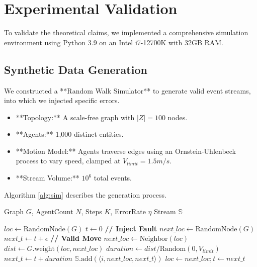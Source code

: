 \documentclass[conference]{IEEEtran}
\begin{document}
\section{Experimental Validation}

To validate the theoretical claims, we implemented a comprehensive simulation environment using Python 3.9 on an Intel i7-12700K with 32GB RAM.

\subsection{Synthetic Data Generation}
We constructed a **Random Walk Simulator** to generate valid event streams, into which we injected specific errors.

\begin{itemize}
    \item **Topology:** A scale-free graph with $|Z|=100$ nodes.
    \item **Agents:** 1,000 distinct entities.
    \item **Motion Model:** Agents traverse edges using an Ornstein-Uhlenbeck process to vary speed, clamped at $V_{limit} = 1.5m/s$.
    \item **Stream Volume:** $10^6$ total events.
\end{itemize}

Algorithm \ref{alg:sim} describes the generation process.

\begin{algorithm}[h]
\caption{Synthetic Stream Generator with Fault Injection}
\begin{algorithmic}[1]
\REQUIRE Graph $G$, AgentCount $N$, Steps $K$, ErrorRate $\eta$
\ENSURE Stream $\mathbb{S}$

    \STATE $loc \leftarrow \text{RandomNode}(G)$
    \STATE $t \leftarrow 0$
            \STATE \textbf{// Inject Fault}
            \STATE $next\_loc \leftarrow \text{RandomNode}(G)$ 
            \STATE $next\_t \leftarrow t + \epsilon$
        \ELSE
            \STATE \textbf{// Valid Move}
            \STATE $next\_loc \leftarrow \text{Neighbor}(loc)$
            \STATE $dist \leftarrow G.\text{weight}(loc, next\_loc)$
            \STATE $duration \leftarrow dist / \text{Random}(0, V_{limit})$
            \STATE $next\_t \leftarrow t + duration$
        \ENDIF
        \STATE $\mathbb{S}.\text{add}(\langle i, next\_loc, next\_t \rangle)$
        \STATE $loc \leftarrow next\_loc; t \leftarrow next\_t$
    \ENDFOR
\ENDFOR
\end{algorithmic}
\label{alg:sim}
\end{algorithm}
\end{document}
